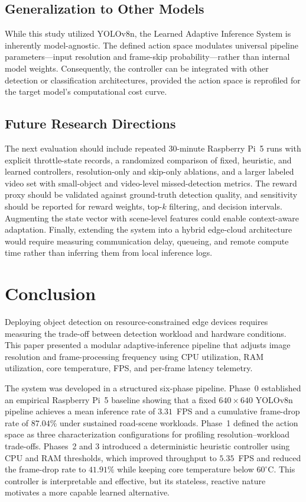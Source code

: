\documentclass{ieeeaccess}
\begin{document}
\subsection{Generalization to Other Models}
While this study utilized YOLOv8n, the Learned Adaptive Inference System is inherently model-agnostic. The defined action space modulates universal pipeline parameters---input resolution and frame-skip probability---rather than internal model weights. Consequently, the controller can be integrated with other detection or classification architectures, provided the action space is reprofiled for the target model's computational cost curve.

\subsection{Future Research Directions}
\begin{highlight}
The next evaluation should include repeated 30-minute Raspberry Pi~5 runs
with explicit throttle-state records, a randomized comparison of fixed,
heuristic, and learned controllers, resolution-only and skip-only ablations,
and a larger labeled video set with small-object and video-level
missed-detection metrics. The reward proxy should be validated against
ground-truth detection quality, and sensitivity should be reported for
reward weights, top-$k$ filtering, and decision intervals. Augmenting the
state vector with scene-level features could enable context-aware
adaptation. Finally, extending the system into a hybrid edge-cloud
architecture would require measuring communication delay, queueing, and
remote compute time rather than inferring them from local inference logs.
\end{highlight}

\section{Conclusion}
\label{sec:conclusion}
\begin{highlight}
Deploying object detection on resource-constrained edge devices requires
measuring the trade-off between detection workload and hardware conditions.
This paper presented a modular adaptive-inference pipeline that adjusts image
resolution and frame-processing frequency using CPU utilization, RAM
utilization, core temperature, FPS, and per-frame latency telemetry.
\end{highlight}

The system was developed in a structured six-phase pipeline. Phase~0
established an empirical Raspberry Pi~5 baseline showing that a fixed
$640\times640$ YOLOv8n pipeline achieves a mean inference rate of
$3.31$~FPS and a cumulative frame-drop rate of $87.04\%$ under sustained
road-scene workloads. Phase~1 defined the action space as three
characterization configurations for profiling resolution--workload trade-offs.
Phases~2 and 3 introduced a deterministic heuristic controller using
CPU and RAM thresholds, which improved throughput to $5.35$~FPS and reduced
the frame-drop rate to $41.91\%$ while keeping core temperature below
$60^\circ$C. This controller is interpretable and effective, but its
stateless, reactive nature motivates a more capable learned alternative.
\end{document}

